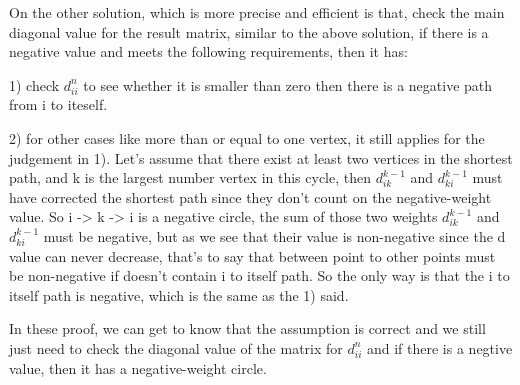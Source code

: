 \documentclass{article}
\begin{document}
On the other solution, which is more precise and efficient is that, check the main diagonal value for the result matrix,
similar to the above solution, if there is a negative value and meets the following requirements, then it has:

1) check $d_{ii}^{n}$ to see whether it is smaller than zero then there is a negative path from i to iteself.

2) for other cases like more than or equal to one vertex, it still applies for the judgement in 1). Let's assume that
there exist at least two vertices in the shortest path, and k is the largest number vertex in this cycle, then
$d_{ik}^{k-1}$ and $d_{ki}^{k-1}$ must have corrected the shortest path since they don't count on the negative-weight
value. So i -> k -> i is a negative circle, the sum of those two weights $d_{ik}^{k-1}$ and $d_{ki}^{k-1}$ must be negative, but as we see that their value is non-negative since the d value can never decrease, that's to say that
between point to other points must be non-negative if doesn't contain i to itself path. So the only way is that the i
to itself path is negative, which is the same as the 1) said.


In these proof, we can get to know that the assumption is correct and we still just need to check the diagonal value
of the matrix for $d_{ii}^{n}$ and if there is a negtive value, then it has a negative-weight circle.
\end{document}
